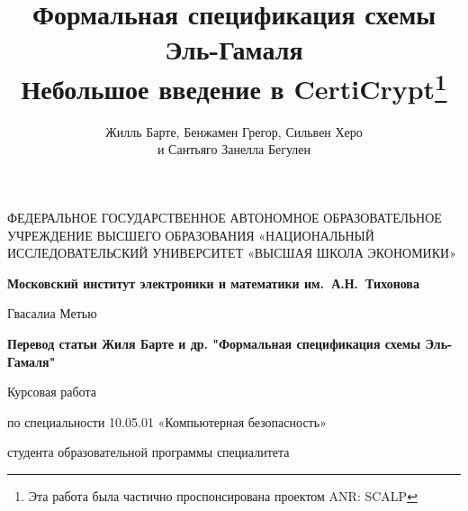 \documentclass[a4paper,12pt]{report}
\title{Формальная спецификация схемы Эль-Гамаля \\
  \large Небольшое введение в CertiCrypt\footnote{Эта работа была частично проспонсирована проектом ANR: SCALP}
}
\author{Жилль Барте, Бенжамен Грегор, Сильвен Херо \\ и Сантьяго Занелла Бегулен}
\begin{document}
\thispagestyle{empty}

\begin{center}

\sc
ФЕДЕРАЛЬНОЕ  ГОСУДАРСТВЕННОЕ АВТОНОМНОЕ
ОБРАЗОВАТЕЛЬНОЕ УЧРЕЖДЕНИЕ ВЫСШЕГО ОБРАЗОВАНИЯ
«НАЦИОНАЛЬНЫЙ ИССЛЕДОВАТЕЛЬСКИЙ УНИВЕРСИТЕТ
«ВЫСШАЯ ШКОЛА ЭКОНОМИКИ»
\end{center}

\begin{center}
\bf Московский институт электроники и математики им.~А.Н.~Тихонова
\end{center}

\vspace{1cm}

\begin{center}
Гвасалиа Метью
\end{center}

\vspace{1cm}

\begin{center}
\bf Перевод статьи Жиля Барте и др. "Формальная спецификация схемы Эль-Гамаля"
\end{center}

\vspace{10mm}

\begin{center}
Курсовая работа \par
по специальности 10.05.01 «Компьютерная безопасность» \par
студента образовательной программы специалитета
\end{center}

\vfill
\end{document}
